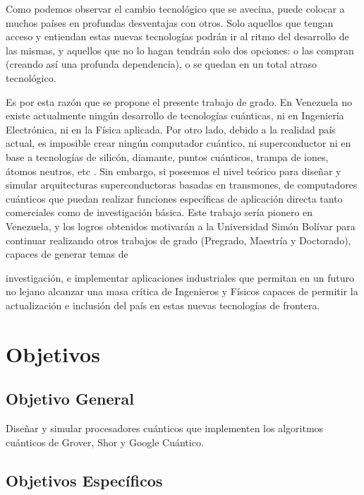 Como podemos observar el cambio tecnológico que se avecina, puede colocar a muchos países en profundas desventajas con otros. Solo aquellos que tengan acceso y entiendan estas nuevas tecnologías podrán ir al ritmo del desarrollo de las mismas, y aquellos que no lo hagan tendrán solo dos opciones: o las compran (creando así una profunda dependencia), o se quedan en un total atraso tecnológico.

Es por esta razón que se propone el presente trabajo de grado. En Venezuela no existe actualmente ningún desarrollo de tecnologías cuánticas, ni en Ingeniería Electrónica, ni en la Física aplicada. Por otro lado, debido a la realidad país actual, es imposible crear ningún computador cuántico, ni superconductor ni en base a tecnologías de silicón, diamante, puntos cuánticos, trampa de iones, átomos neutros, etc \cite{Nakahara_2008}. Sin embargo, si poseemos el nivel teórico para diseñar y simular arquitecturas superconductoras basadas en transmones, de computadores cuánticos que puedan realizar funciones específicas de aplicación directa tanto comerciales como de investigación básica.  Este trabajo sería pionero en Venezuela, y los logros obtenidos motivarán a la Universidad Simón Bolívar para continuar realizando otros trabajos de grado (Pregrado, Maestría y Doctorado), capaces de generar temas de

investigación, e implementar aplicaciones industriales que permitan en un futuro no lejano alcanzar una masa crítica de Ingenieros y Físicos capaces de permitir la actualización e inclusión del país en estas nuevas tecnologías de frontera.

\section{Objetivos}

\subsection{Objetivo General}

Diseñar y simular procesadores cuánticos que implementen los algoritmos cuánticos de Grover, Shor y Google Cuántico.

\subsection{Objetivos Específicos}

